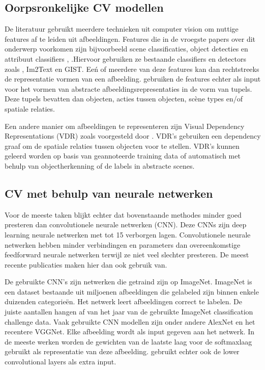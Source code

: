 \subsection{Oorpsronkelijke CV modellen}
De literatuur gebruikt meerdere technieken uit computer vision om nuttige features af te leiden uit afbeeldingen. Features die in de vroegste papers over dit onderwerp voorkomen zijn bijvoorbeeld scene classificaties, object detecties en attribuut classifiers \cite{Farhadi2010},\cite{Yang2011}\cite{Patterson} .Hiervoor gebruiken ze bestaande classifiers en detectors zoals \cite{Felzenszwalb2008}, Im2Text \cite{Ordonez2011} en GIST\cite{Oliva2006}. Ee\'n of meerdere van deze features kan dan rechtstreeks de representatie vormen van een afbeelding. \cite{Farhadi2010} \cite{Yang2011} \cite{Li} \cite{Mitchell} gebruiken de features echter als input voor het vormen van abstracte afbeeldingsrepresentaties in de vorm van tupels. Deze tupels bevatten dan objecten, acties tussen objecten, sc\`ene types en/of spatiale relaties.

Een andere manier om afbeeldingen te representeren zijn Visual Dependency Representations (VDR) zoals voorgesteld door \cite{Eliott2013}. VDR's gebruiken een dependency graaf om de spatiale relaties tussen objecten voor te stellen. VDR's kunnen geleerd worden op basis van geannoteerde training data of automatisch met behulp van objectherkenning \cite{Eliott2015} of de labels in abstracte scenes. \cite{Gilberto2015} 

\subsection{CV met behulp van neurale netwerken}
Voor de meeste taken blijkt echter dat  bovenstaande methodes minder goed presteren dan convolutionele neurale netwerken (CNN). Deze CNNs zijn deep learning neurale netwerken met tot 15 verborgen lagen. Convolutionele neurale netwerken hebben minder verbindingen en parameters dan overeenkomstige feedforward neurale netwerken terwijl ze niet veel slechter presteren. \cite{Krizhevsky2012} De meest recente publicaties maken hier dan ook gebruik van. 

De gebruikte CNN's zijn netwerken die getraind zijn op ImageNet.\cite{Krizhevsky2012} ImageNet is een dataset bestaande uit miljoenen afbeeldingen die gelabeled zijn binnen enkele duizenden categorie\"en. Het netwerk leert afbeeldingen correct te labelen. De juiste aantallen hangen af van het jaar van de gebruikte ImageNet classification challenge data. Vaak gebruikte CNN modellen zijn onder andere AlexNet \cite{Krizhevsky} en het recentere VGGNet\cite{Simonyan}. Elke afbeelding wordt als input gegeven aan het netwerk. In de meeste werken worden de gewichten van de laatste laag voor de softmaxlaag gebruikt als representatie van deze afbeelding.  \cite{Xu2015} gebruikt echter ook de lower convolutional layers als extra input.

